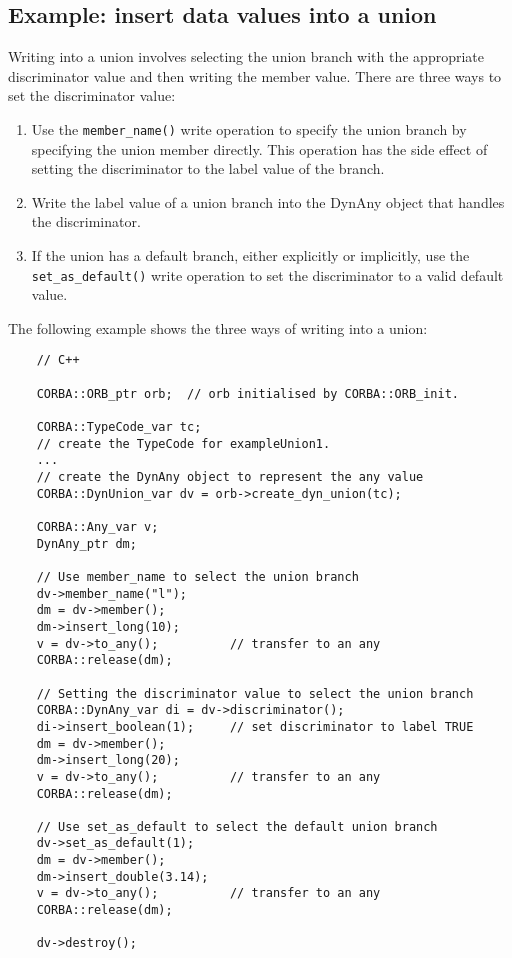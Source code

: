 \documentclass[11pt,twoside,onecolumn]{book}
\begin{document}
\subsection{Example: insert data values into a union}

Writing into a union involves selecting the union branch with the
appropriate discriminator value and then writing the member value.
There are three ways to set the discriminator value:

\begin{enumerate}
\item Use the {\tt member\_name()} write operation to specify the union
branch by specifying the union member directly. This operation has the side
effect of setting the discriminator to the label value of the
branch.
\item Write the label value of a union branch into the DynAny
object that handles the discriminator.
\item If the union has a default branch, either explicitly or implicitly,
use the {\tt set\_as\_default()} write operation to set the discriminator
to a valid default value.
\end{enumerate}

The following example shows the three ways of writing into a union:

{\small
\begin{verbatim}
    // C++
    
    CORBA::ORB_ptr orb;  // orb initialised by CORBA::ORB_init.
    
    CORBA::TypeCode_var tc;
    // create the TypeCode for exampleUnion1.
    ...
    // create the DynAny object to represent the any value
    CORBA::DynUnion_var dv = orb->create_dyn_union(tc);
    
    CORBA::Any_var v;
    DynAny_ptr dm;
    
    // Use member_name to select the union branch
    dv->member_name("l");
    dm = dv->member();
    dm->insert_long(10);
    v = dv->to_any();          // transfer to an any
    CORBA::release(dm);
    
    // Setting the discriminator value to select the union branch
    CORBA::DynAny_var di = dv->discriminator();
    di->insert_boolean(1);     // set discriminator to label TRUE
    dm = dv->member();
    dm->insert_long(20);
    v = dv->to_any();          // transfer to an any
    CORBA::release(dm);
    
    // Use set_as_default to select the default union branch
    dv->set_as_default(1);
    dm = dv->member();
    dm->insert_double(3.14);
    v = dv->to_any();          // transfer to an any
    CORBA::release(dm);
    
    dv->destroy();

\end{verbatim}
}
\end{document}
